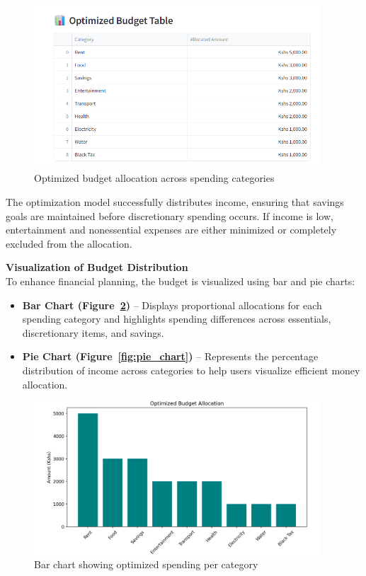 \documentclass{article}
\begin{document}
\begin{figure}[h!]
    \centering
    \includegraphics[width=0.95\textwidth]{tablebg.png}
    \caption{Optimized budget allocation across spending categories}
    \label{fig:budget_allocation}
\end{figure}

The optimization model successfully distributes income, ensuring that savings goals are maintained before discretionary spending occurs. If income is low, entertainment and nonessential expenses are either minimized or completely excluded from the allocation.

\textbf{Visualization of Budget Distribution} \\
To enhance financial planning, the budget is visualized using bar and pie charts:

\begin{itemize}
    \item \textbf{Bar Chart (Figure~\ref{fig:bar_chart})} – Displays proportional allocations for each spending category and highlights spending differences across essentials, discretionary items, and savings.
    \item \textbf{Pie Chart (Figure~\ref{fig:pie_chart})} – Represents the percentage distribution of income across categories to help users visualize efficient money allocation.
\end{itemize}

\begin{figure}[h!]
    \centering
    \includegraphics[width=0.95\textwidth]{optimizedbudget.png}
    \caption{Bar chart showing optimized spending per category}
    \label{fig:bar_chart}
\end{figure}
\end{document}
